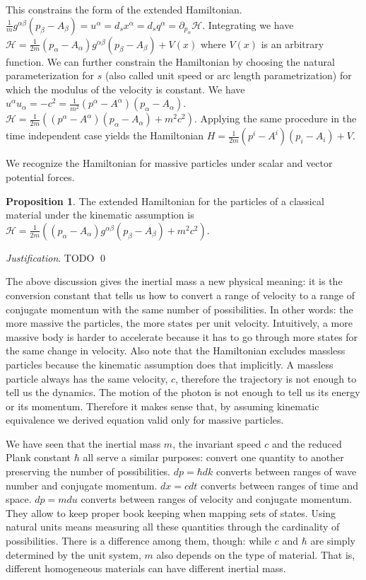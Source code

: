 \documentclass[aps,pra,10pt,twocolumn,floatfix,nofootinbib]{revtex4-1}
\numberwithin{equation}{section}
\theoremstyle{definition}
\newtheorem{prop}[equation]{Proposition}
\newenvironment{justification}{\emph{Justification}.}{\qed}
\begin{document}
This constrains the form of the extended Hamiltonian. $\frac{1}{m}g^{\alpha\beta}(p_\beta-A_\beta) = u^\alpha = d_s x^\alpha = d_s q^\alpha = \partial_{p_\alpha} \mathcal{H}$. Integrating we have $\mathcal{H}=\frac{1}{2m}(p_\alpha-A_\alpha)g^{\alpha\beta}(p_\beta-A_\beta)+V(x)$ where $V(x)$ is an arbitrary function. We can further constrain the Hamiltonian by choosing the natural parameterization for $s$ (also called unit speed or arc length parametrization) for which the modulus of the velocity is constant. We have $u^\alpha u_\alpha = - c^2 = \frac{1}{m^2}(p^\alpha-A^\alpha)(p_\alpha-A_\alpha)$. $\mathcal{H}=\frac{1}{2m}((p^\alpha-A^\alpha)(p_\alpha-A_\alpha) + m^2 c^2)$. Applying the same procedure in the time independent case yields the Hamiltonian $H=\frac{1}{2m}(p^i-A^i)(p_i-A_i)+V$.

We recognize the Hamiltonian for massive particles under scalar and vector potential forces.

\begin{prop}\label{kineticHamiltonian}
The extended Hamiltonian for the particles of a classical material under the kinematic assumption is $\mathcal{H}=\frac{1}{2m}((p_\alpha-A_\alpha)g^{\alpha\beta}(p_\beta-A_\beta) + m^2 c^2)$.
\end{prop}

\begin{justification}
	TODO
\end{justification}

The above discussion gives the inertial mass a new physical meaning: it is the conversion constant that tells us how to convert a range of velocity to a range of conjugate momentum with the same number of possibilities. In other words: the more massive the particles, the more states per unit velocity. Intuitively, a more massive body is harder to accelerate because it has to go through more states for the same change in velocity. Also note that the Hamiltonian excludes massless particles because the kinematic assumption does that implicitly. A massless particle always has the same velocity, $c$, therefore the trajectory is not enough to tell us the dynamics. The motion of the photon is not enough to tell us its energy or its momentum. Therefore it makes sense that, by assuming kinematic equivalence we derived equation valid only for massive particles.

We have seen that the inertial mass $m$, the invariant speed $c$ and the reduced Plank constant $\hbar$ all serve a similar purposes: convert one quantity to another preserving the number of possibilities. $dp=\hbar dk$ converts between ranges of wave number and conjugate momentum. $dx = c dt$ converts between ranges of time and space. $dp = m du$ converts between ranges of velocity and conjugate momentum. They allow to keep proper book keeping when mapping sets of states. Using natural units means measuring all these quantities through the cardinality of possibilities. There is a difference among them, though: while $c$ and $\hbar$ are simply determined by the unit system, $m$ also depends on the type of material. That is, different homogeneous materials can have different inertial mass.
\end{document}
